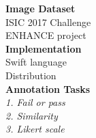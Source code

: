 \documentclass[../presentation.tex]{subfiles}
\begin{document}
\twocolumn
\null
\vfill

\large{\textbf{Image Dataset}} \\
\large{ISIC 2017 Challenge} \\
\large{ENHANCE project} \\

\large{\textbf{Implementation}} \\
\large{Swift language} \\
\large{Distribution} \\

\large{\textbf{Annotation Tasks}} \\
\large{\textit{1. Fail or pass}} \\
\large{\textit{2. Similarity}} \\
\large{\textit{3. Likert scale}}

\vfill
\pagebreak
\null
\vfill


\vfill
\onecolumn
\end{document}
